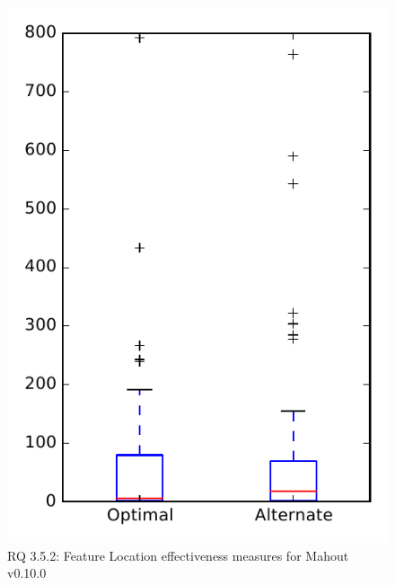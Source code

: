 
\begin{figure}
\centering
\includegraphics[height=0.4\textheight]{figures/combo/flt_rq2_mahout}
\caption{RQ 3.5.2: Feature Location effectiveness measures for Mahout v0.10.0}
\label{fig:flt:rq2:mahout}
\end{figure}
